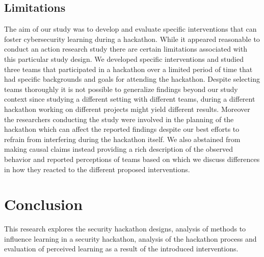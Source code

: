 \documentclass[runningheads]{llncs}
\begin{document}
\subsection{Limitations}
The aim of our study was to develop and evaluate specific interventions that can foster cybersecurity learning during a hackathon. While it appeared reasonable to conduct an action research study \cite{lewin1946action} there are certain limitations associated with this particular study design. We developed specific interventions and studied three teams that participated in a hackathon over a limited period of time that had specific backgrounds and goals for attending the hackathon. Despite selecting teams thoroughly it is not possible to generalize findings beyond our study context since studying a different setting with different teams, during a different hackathon working on different projects might yield different results. Moreover the researchers conducting the study were involved in the planning of the hackathon which can affect the reported findings despite our best efforts to refrain from interfering during the hackathon itself. We also abstained from making causal claims instead providing a rich description of the observed behavior and reported perceptions of teams based on which we discuss differences in how they reacted to the different proposed interventions.

\section{Conclusion}
This research explores the security hackathon designs, analysis of methods to influence learning in a security hackathon, analysis of the hackathon process and evaluation of perceived learning as a result of the introduced interventions.



\end{document}

